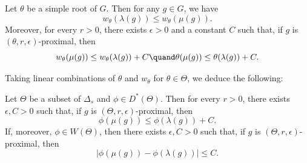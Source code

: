 \begin{lemma} \label{lem - ComparisonMuLambdaProximalElement}
Let $\theta$ be a simple root of $G$. Then for any $g\in G$, we have
\[w_\theta(\lambda(g)) \leq w_\theta(\mu(g)).\]
Moreover, for every $r>0$, there exists $\epsilon >0$ and a constant $C$ such that, if $g$ is $(\theta,r,\epsilon)$-proximal, then
\[w_\theta(\mu(g)) \leq w_\theta(\lambda(g)) + C\quand
\theta(\mu(g)) \leq \theta(\lambda(g)) + C.\]
\end{lemma}
Taking linear combinations of $\theta$ and $w_\theta$ for $\theta \in \Theta$, we deduce the following:
\begin{coro} \label{coro - ComparisonMuLambdaProximalElement}
Let $\Theta$ be a subset of $\Delta_s$ and $\phi \in D^*(\Theta)$. Then for every $r>0$, there exists $\epsilon, C>0$ such that, if $g$ is $(\Theta,r,\epsilon)$-proximal, then
\[\phi(\mu(g)) \leq \phi(\lambda(g)) + C.\]
If, moreover, $\phi \in W(\Theta)$, then there exists $\epsilon, C>0$ such that, if $g$ is $(\Theta,r,\epsilon)$-proximal, then
\[\vert \phi(\mu(g)) -\phi(\lambda(g))\vert \leq C.\]
\end{coro}

